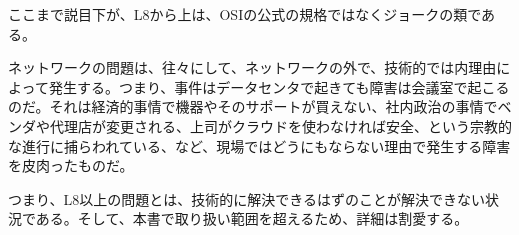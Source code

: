 ここまで説目下が、L8から上は、OSIの公式の規格ではなくジョークの類である。

ネットワークの問題は、往々にして、ネットワークの外で、技術的では内理由によって発生する。つまり、事件はデータセンタで起きても障害は会議室で起こるのだ。それは経済的事情で機器やそのサポートが買えない、社内政治の事情でベンダや代理店が変更される、上司がクラウドを使わなければ安全、という宗教的な進行に捕らわれている、など、現場ではどうにもならない理由で発生する障害を皮肉ったものだ。

つまり、L8以上の問題とは、技術的に解決できるはずのことが解決できない状況である。そして、本書で取り扱い範囲を超えるため、詳細は割愛する。

